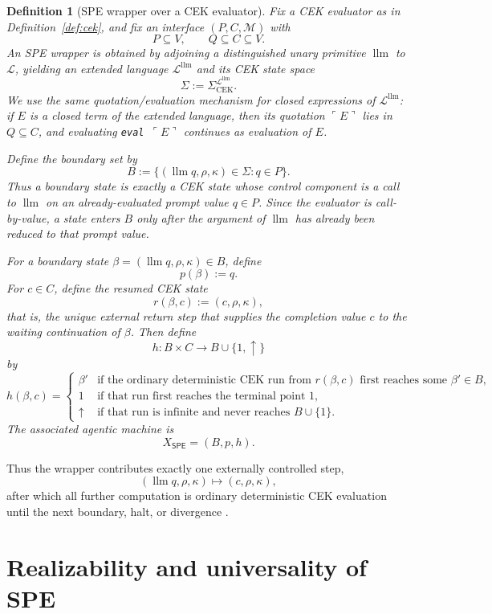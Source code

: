 \documentclass[11pt]{article}
\newtheorem{definition}{Definition}[section]
\newcommand{\SPE}{\mathsf{SPE}}
\newcommand{\llm}{\operatorname{llm}}
\begin{document}
\begin{definition}[SPE wrapper over a CEK evaluator]\label{def:spe}
Fix a CEK evaluator as in Definition~\ref{def:cek}, and fix an interface $(P,C,\mathcal{M})$ with
\[
P\subseteq V,
\qquad
Q\subseteq C\subseteq V.
\]
An \emph{SPE wrapper} is obtained by adjoining a distinguished unary primitive $\llm$ to $\mathcal{L}$, yielding an extended language $\mathcal{L}^{\llm}$ and its CEK state space
\[
\Sigma:=\Sigma_{\mathrm{CEK}}^{\mathcal{L}^{\llm}}.
\]
We use the same quotation/evaluation mechanism for closed expressions of $\mathcal{L}^{\llm}$: if $E$ is a closed term of the extended language, then its quotation $\ulcorner E\urcorner$ lies in $Q\subseteq C$, and evaluating \texttt{eval} $\,\ulcorner E\urcorner$ continues as evaluation of $E$.

Define the boundary set by
\[
B:=\{(\llm q,\rho,\kappa)\in\Sigma : q\in P\}.
\]
Thus a boundary state is exactly a CEK state whose control component is a call to $\llm$ on an already-evaluated prompt value $q\in P$. Since the evaluator is call-by-value, a state enters $B$ only after the argument of $\llm$ has already been reduced to that prompt value.

For a boundary state $\beta=(\llm q,\rho,\kappa)\in B$, define
\[
p(\beta):=q.
\]
For $c\in C$, define the resumed CEK state
\[
r(\beta,c):=(c,\rho,\kappa),
\]
that is, the unique external return step that supplies the completion value $c$ to the waiting continuation of $\beta$. Then define
\[
h:B\times C\to B\cup\{1,\uparrow\}
\]
by
\[
h(\beta,c)=
\begin{cases}
\beta' & \text{if the ordinary deterministic CEK run from } r(\beta,c) \text{ first reaches some } \beta'\in B,\\
1 & \text{if that run first reaches the terminal point } 1,\\
\uparrow & \text{if that run is infinite and never reaches } B\cup\{1\}.
\end{cases}
\]
The associated agentic machine is
\[
X_{\SPE}=(B,p,h).
\]
\end{definition}

Thus the wrapper contributes exactly one externally controlled step,
\[
(\llm q,\rho,\kappa)\longmapsto (c,\rho,\kappa),
\]
after which all further computation is ordinary deterministic CEK evaluation until the next boundary, halt, or divergence \cite{LeroyGrall09}.

\section{Realizability and universality of SPE}
\end{document}

